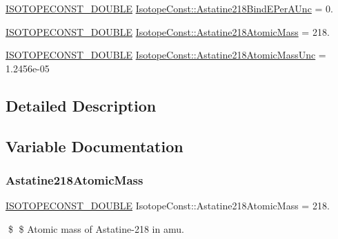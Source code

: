 \begin{DoxyCompactItemize}
\mbox{\hyperlink{group___isotope_const-_macros_ga8f45a7272ce02c0b4c65c44636ed719a}{I\+S\+O\+T\+O\+P\+E\+C\+O\+N\+S\+T\+\_\+\+D\+O\+U\+B\+LE}} \mbox{\hyperlink{group___isotope_const-_astatine-_at218_gac527df2aeb6d6e1bc96ea44997f2560e}{Isotope\+Const\+::\+Astatine218\+Bind\+E\+Per\+A\+Unc}} = 0.
\item 
\mbox{\hyperlink{group___isotope_const-_macros_ga8f45a7272ce02c0b4c65c44636ed719a}{I\+S\+O\+T\+O\+P\+E\+C\+O\+N\+S\+T\+\_\+\+D\+O\+U\+B\+LE}} \mbox{\hyperlink{group___isotope_const-_astatine-_at218_ga3c7b122e3e4d8b5466b183a66eb80dd5}{Isotope\+Const\+::\+Astatine218\+Atomic\+Mass}} = 218.
\item 
\mbox{\hyperlink{group___isotope_const-_macros_ga8f45a7272ce02c0b4c65c44636ed719a}{I\+S\+O\+T\+O\+P\+E\+C\+O\+N\+S\+T\+\_\+\+D\+O\+U\+B\+LE}} \mbox{\hyperlink{group___isotope_const-_astatine-_at218_ga9f61cf92ad2150a97b450754cf450bb0}{Isotope\+Const\+::\+Astatine218\+Atomic\+Mass\+Unc}} = 1.\+2456e-\/05
\end{DoxyCompactItemize}


\subsection{Detailed Description}


\subsection{Variable Documentation}
\mbox{\label{group___isotope_const-_astatine-_at218_ga3c7b122e3e4d8b5466b183a66eb80dd5}} 
\subsubsection{\texorpdfstring{Astatine218\+Atomic\+Mass}{Astatine218AtomicMass}}
{\footnotesize\ttfamily \mbox{\hyperlink{group___isotope_const-_macros_ga8f45a7272ce02c0b4c65c44636ed719a}{I\+S\+O\+T\+O\+P\+E\+C\+O\+N\+S\+T\+\_\+\+D\+O\+U\+B\+LE}} Isotope\+Const\+::\+Astatine218\+Atomic\+Mass = 218.}

\$ \$ Atomic mass of Astatine-\/218 in amu. \mbox{\label{group___isotope_const-_astatine-_at218_ga9f61cf92ad2150a97b450754cf450bb0}} 
